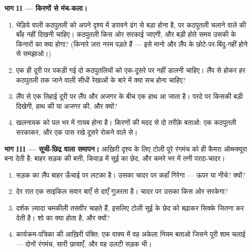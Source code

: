 \begin{problem}
\medskip\noindent\textbf{भाग II --- किरणों से मंच-कला।}
\begin{enumerate}[resume]
  \item भेड़िये वाली कठपुतली को अपने दृश्य में डरावने ढंग से बड़ा
        होना है, पर कठपुतली चलाने वाले की बाँह नहीं दिखनी चाहिए।
        कठपुतली किस ओर सरकाई जाएगी, और बड़ी होते समय उसकी  के
        किनारों का क्या होगा? (किनारे ज़रा नरम पड़ते हैं --- इसे
        मानो और लैंप के छोटे-पर-बिंदु-नहीं होने से समझाओ।)
  \item एक ही दूरी पर पकड़ी गई दो कठपुतलियों को एक-दूसरे पर  नहीं
        डालनी चाहिए। लैंप से होकर हर कठपुतली तक जाने वाली सीधी
        रेखाओं के बारे में क्या सच होना चाहिए?
  \item लैंप से एक तिहाई दूरी पर लैंप और अजगर के बीच एक हाथ आ जाता
        है। परदे पर किसकी  बड़ी दिखेगी, हाथ की या अजगर की, और
        क्यों?
  \item खलनायक को पल भर में ग़ायब होना है। किरणों की मदद से दो तरीक़े
        बताओ: एक कठपुतली सरकाकर, और एक पास रखे दूसरे रोकने वाले से।
\end{enumerate}

\medskip\noindent\textbf{भाग III --- सूची-छिद्र वाला समापन।}
आख़िरी दृश्य के लिए टोली पूरे रंगमंच को ही कैमरा ऑब्स्क्यूरा बना देती
है: बाहर सड़क की बत्ती, किवाड़ में सूई का छेद, और कमरे भर में तनी
परदा-चादर।
\begin{enumerate}[resume]
  \item सड़क का लैंप बाहर ऊँचाई पर लटका है। उसका  चादर पर
        कहाँ गिरेगा --- ऊपर या नीचे? क्यों?
  \item देर रात एक साइकिल सवार बाएँ से दाएँ गुज़रता है। चादर पर उसका
         किस ओर सरकेगा?
  \item दर्शक ज़्यादा चमकीली तसवीर चाहते हैं, इसलिए टोली सूई के छेद
        को बढ़ाकर सिक्के जितना कर देती है। शो का क्या होता है, और
        क्यों?
  \item कार्यक्रम-पत्रिका की आख़िरी पंक्ति: एक वाक्य में वह अकेला
        नियम बताओ जिसने पूरी शाम चलाई --- दोनों रंगमंच, सारी छायाएँ,
        और वह उलटी सड़क भी।
\end{enumerate}
\end{problem}
